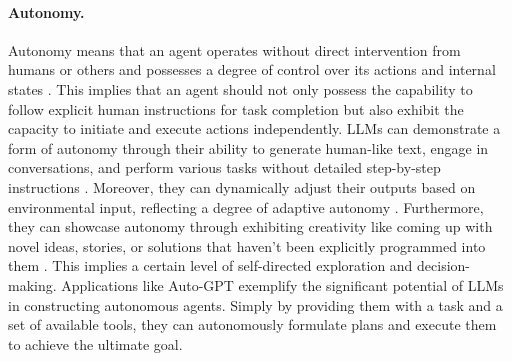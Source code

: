 \documentclass{article}
\begin{document}
\paragraph{Autonomy.} Autonomy means that an agent operates without direct intervention from humans or others and possesses a degree of control over its actions and internal states \cite{DBLP:journals/ker/WooldridgeJ95,DBLP:conf/ecaiw/Castelfranchi94}. 
This implies that an agent should not only possess the capability to follow explicit human instructions for task completion but also exhibit the capacity to initiate and execute actions independently. 
LLMs can demonstrate a form of autonomy through their ability to generate human-like text, engage in conversations, and perform various tasks without detailed step-by-step instructions \cite{gravitasauto,nakajima2023babyagi}. 
Moreover, they can dynamically adjust their outputs based on environmental input, reflecting a degree of adaptive autonomy \cite{DBLP:journals/corr/abs-2305-13246,DBLP:journals/corr/abs-2305-16960,liu2023languages}. 
Furthermore, they can showcase autonomy through exhibiting creativity like coming up with novel ideas, stories, or solutions that haven't been explicitly programmed into them \cite{DBLP:conf/iui/YuanCRI22,DBLP:journals/corr/abs-2304-00008}. 
This implies a certain level of self-directed exploration and decision-making. 
Applications like Auto-GPT \cite{gravitasauto} exemplify the significant potential of LLMs in constructing autonomous agents. Simply by providing them with a task and a set of available tools, they can autonomously formulate plans and execute them to achieve the ultimate goal.
\end{document}

